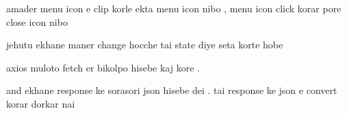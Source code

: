 


amader menu icon e clip korle ekta menu icon nibo , menu icon click korar pore close icon nibo 

jehutu ekhane maner change hocche tai state diye seta korte hobe 


axios muloto fetch er bikolpo hisebe kaj kore . 

and ekhane response ke sorasori json hisebe dei . tai response ke json e convert korar dorkar nai 




